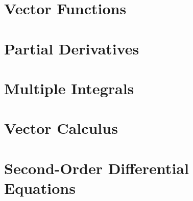   \chapter{Vector Functions}
    
    
    
    

  \chapter{Partial Derivatives}
    
    
    
    
    
    
    
    

  \chapter{Multiple Integrals}
    
    
    
    
    
    
    
    
    

  \chapter{Vector Calculus}
    
    
    
    
    
    
    
    
    
    

  \chapter{Second-Order Differential Equations}
    
    
    
    


